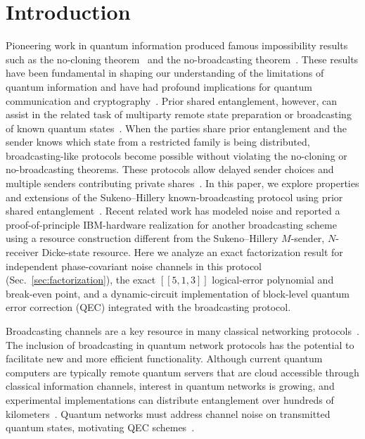 \documentclass[aps,physrev,10pt,twocolumn,superscriptaddress,floatfix]{revtex4-2}
\begin{document}
\section{Introduction \label{Introduction}}
Pioneering work in quantum information produced famous impossibility results such as the no-cloning theorem~\cite{wootters2009no} and the no-broadcasting theorem~\cite{barnum1996noncommuting,barnum2007generalized}. These results have been fundamental in shaping our understanding of the limitations of quantum information and have had profound implications for quantum communication and cryptography~\cite{vsupic2020self}. Prior shared entanglement, however, can assist in the related task of multiparty remote state preparation or broadcasting of known quantum states~\cite{kumar2024multiparty}. When the parties share prior entanglement and the sender knows which state from a restricted family is being distributed, broadcasting-like protocols become possible without violating the no-cloning or no-broadcasting theorems. These protocols allow delayed sender choices and multiple senders contributing private shares~\cite{larasati2025towards,zhang2025efficient,sukeno2025quantum,andronikos2023one}. In this paper, we explore properties and extensions of the Sukeno--Hillery known-broadcasting protocol using prior shared entanglement~\cite{PhysRevA.105.042611,sukeno2023broadcasting}. Recent related work has modeled noise and reported a proof-of-principle IBM-hardware realization for another broadcasting scheme~\cite{kumar2024multiparty} using a resource construction different from the Sukeno--Hillery $M$-sender, $N$-receiver Dicke-state resource. Here we analyze an exact factorization result for independent phase-covariant noise channels in this protocol (Sec.~\ref{sec:factorization}), the exact $[[5,1,3]]$ logical-error polynomial and break-even point, and a dynamic-circuit implementation of block-level quantum error correction (QEC) integrated with the broadcasting protocol.

Broadcasting channels are a key resource in many classical networking protocols~\cite{chang1984reliable}. The inclusion of broadcasting in quantum network protocols has the potential to facilitate new and more efficient functionality. Although current quantum computers are typically remote quantum servers that are cloud accessible through classical information channels, interest in quantum networks is growing, and experimental implementations can distribute entanglement over hundreds of kilometers~\cite{simon2017towards, pompili2021realization, neumann2022continuous}. Quantum networks must address channel noise on transmitted quantum states, motivating QEC schemes~\cite{gottesman1997stabilizer}.
\end{document}
